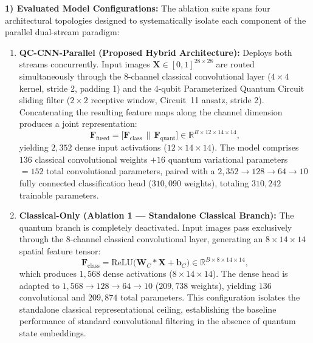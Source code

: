 \documentclass[journal]{IEEEtran}
\begin{document}
\textbf{1) Evaluated Model Configurations:}
The ablation suite spans four architectural topologies designed to systematically isolate each component of the parallel dual-stream paradigm:
\begin{enumerate}
    \item \textbf{QC-CNN-Parallel (Proposed Hybrid Architecture):} Deploys both streams concurrently. Input images $\mathbf{X} \in [0, 1]^{28 \times 28}$ are routed simultaneously through the 8-channel classical convolutional layer ($4 \times 4$ kernel, stride 2, padding 1) and the 4-qubit Parameterized Quantum Circuit sliding filter ($2 \times 2$ receptive window, Circuit~11 ansatz, stride 2). Concatenating the resulting feature maps along the channel dimension produces a joint representation:
    \begin{equation}
    \mathbf{F}_{\mathrm{fused}} = \big[ \mathbf{F}_{\mathrm{class}} \,\|\, \mathbf{F}_{\mathrm{quant}} \big] \in \mathbb{R}^{B \times 12 \times 14 \times 14},
    \label{eq:ablation_fused_tensor}
    \end{equation}
    yielding $2{,}352$ dense input activations ($12 \times 14 \times 14$). The model comprises $136$ classical convolutional weights $+ 16$ quantum variational parameters $= 152$ total convolutional parameters, paired with a $2{,}352 \to 128 \to 64 \to 10$ fully connected classification head ($310{,}090$ weights), totaling $310{,}242$ trainable parameters.

    \item \textbf{Classical-Only (Ablation 1 --- Standalone Classical Branch):} The quantum branch is completely deactivated. Input images pass exclusively through the 8-channel classical convolutional layer, generating an $8 \times 14 \times 14$ spatial feature tensor:
    \begin{equation}
    \mathbf{F}_{\mathrm{class}} = \mathrm{ReLU}\big( \mathbf{W}_C * \mathbf{X} + \mathbf{b}_C \big) \in \mathbb{R}^{B \times 8 \times 14 \times 14},
    \label{eq:classical_only_tensor}
    \end{equation}
    which produces $1{,}568$ dense activations ($8 \times 14 \times 14$). The dense head is adapted to $1{,}568 \to 128 \to 64 \to 10$ ($209{,}738$ weights), yielding $136$ convolutional and $209{,}874$ total parameters. This configuration isolates the standalone classical representational ceiling, establishing the baseline performance of standard convolutional filtering in the absence of quantum state embeddings.


\end{enumerate}
\end{document}
